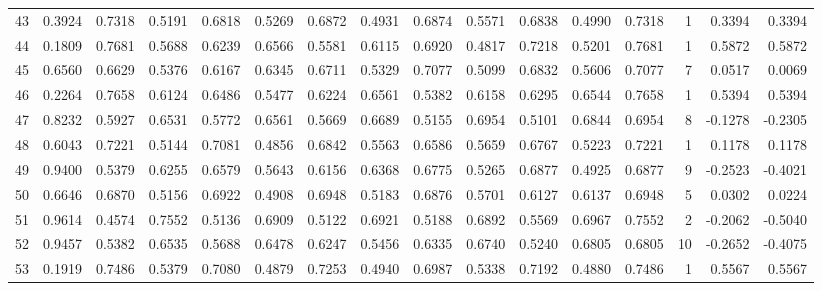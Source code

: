 \begin{tabular}{lrrrrrrrrrrrrrrr}
43  &      0.3924 &  0.7318 &  0.5191 &  0.6818 &  0.5269 &  0.6872 &  0.4931 &  0.6874 &  0.5571 &  0.6838 &   0.4990 &     0.7318 &      1 &                    0.3394 &                     0.3394 \\
44  &      0.1809 &  0.7681 &  0.5688 &  0.6239 &  0.6566 &  0.5581 &  0.6115 &  0.6920 &  0.4817 &  0.7218 &   0.5201 &     0.7681 &      1 &                    0.5872 &                     0.5872 \\
45  &      0.6560 &  0.6629 &  0.5376 &  0.6167 &  0.6345 &  0.6711 &  0.5329 &  0.7077 &  0.5099 &  0.6832 &   0.5606 &     0.7077 &      7 &                    0.0517 &                     0.0069 \\
46  &      0.2264 &  0.7658 &  0.6124 &  0.6486 &  0.5477 &  0.6224 &  0.6561 &  0.5382 &  0.6158 &  0.6295 &   0.6544 &     0.7658 &      1 &                    0.5394 &                     0.5394 \\
47  &      0.8232 &  0.5927 &  0.6531 &  0.5772 &  0.6561 &  0.5669 &  0.6689 &  0.5155 &  0.6954 &  0.5101 &   0.6844 &     0.6954 &      8 &                   -0.1278 &                    -0.2305 \\
48  &      0.6043 &  0.7221 &  0.5144 &  0.7081 &  0.4856 &  0.6842 &  0.5563 &  0.6586 &  0.5659 &  0.6767 &   0.5223 &     0.7221 &      1 &                    0.1178 &                     0.1178 \\
49  &      0.9400 &  0.5379 &  0.6255 &  0.6579 &  0.5643 &  0.6156 &  0.6368 &  0.6775 &  0.5265 &  0.6877 &   0.4925 &     0.6877 &      9 &                   -0.2523 &                    -0.4021 \\
50  &      0.6646 &  0.6870 &  0.5156 &  0.6922 &  0.4908 &  0.6948 &  0.5183 &  0.6876 &  0.5701 &  0.6127 &   0.6137 &     0.6948 &      5 &                    0.0302 &                     0.0224 \\
51  &      0.9614 &  0.4574 &  0.7552 &  0.5136 &  0.6909 &  0.5122 &  0.6921 &  0.5188 &  0.6892 &  0.5569 &   0.6967 &     0.7552 &      2 &                   -0.2062 &                    -0.5040 \\
52  &      0.9457 &  0.5382 &  0.6535 &  0.5688 &  0.6478 &  0.6247 &  0.5456 &  0.6335 &  0.6740 &  0.5240 &   0.6805 &     0.6805 &     10 &                   -0.2652 &                    -0.4075 \\
53  &      0.1919 &  0.7486 &  0.5379 &  0.7080 &  0.4879 &  0.7253 &  0.4940 &  0.6987 &  0.5338 &  0.7192 &   0.4880 &     0.7486 &      1 &                    0.5567 &                     0.5567 \\

\end{tabular}
